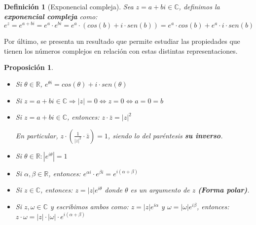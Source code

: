\documentclass[10pt,a4paper,openright]{book}
\theoremstyle{break}
\newtheorem{defi}{Definición}[chapter]
\newtheorem{prop}{Proposición}[chapter]
\begin{document}
\begin{defi}[Exponencial compleja]
Sea $z=a+bi\in \mathbb C$, definimos la \textbf{exponencial compleja} como:
$$e^z = e^{a+bi}=e^a\cdot e^{bi}=e^a\cdot (cos(b)+i\cdot sen(b))=e^a\cdot cos(b)+e^a\cdot i\cdot sen(b)$$
\end{defi}

Por último, se presenta un resultado que permite estudiar las propiedades que tienen los números complejos en relación con estas distintas representaciones.

\begin{prop}
\begin{itemize}
\item Si $\theta \in \mathbb R$, $e^{\theta i}=cos(\theta)+i\cdot sen(\theta)$

\item Si $z=a+bi\in \mathbb C\Rightarrow |z|=0\Leftrightarrow z=0\Leftrightarrow a=0=b$

\item Si $z=a+bi\in \mathbb C$, entonces: $z\cdot \bar{z}=|z|^2$\par
En particular, $z\cdot (\frac{1}{|z|^2}\cdot \bar{z})=1$, siendo lo del paréntesis \textbf{su inverso}.

\item Si $\theta\in \mathbb R: |e^{i\theta}|=1$

\item Si $\alpha, \beta \in \mathbb R$, entonces: $e^{\alpha i}\cdot e^{\beta i}=e^{i(\alpha +\beta)}$

\item Si $z\in \mathbb C$, entonces: $z=|z|e^{i\theta}$ donde $\theta$ es un argumento de $z$ \textbf{(Forma polar)}.

\item Si $z, \omega \in \mathbb C$ y escribimos ambos como: $z=|z|e^{i\alpha}$ y $\omega=|\omega|e^{i\beta}$, entonces: $z\cdot \omega=|z|\cdot |\omega|\cdot e^{i(\alpha +\beta)}$\par
\end{itemize}
\end{prop}
\end{document}
